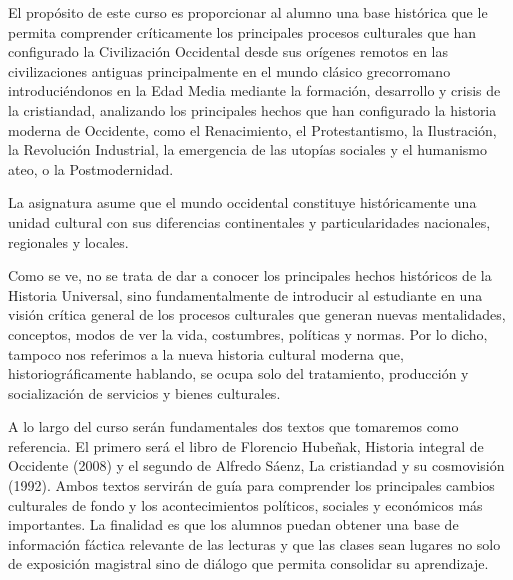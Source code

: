 \begin{syllabus}


\begin{justification}
	El propósito de este curso es proporcionar al alumno una base histórica 
	que le permita comprender críticamente los principales procesos culturales 
	que han configurado la Civilización Occidental desde sus orígenes remotos en 
	las civilizaciones antiguas principalmente en el mundo clásico grecorromano 
	introduciéndonos en la Edad Media mediante la formación, desarrollo y crisis 
	de la cristiandad, analizando los principales hechos que han configurado la 
	historia moderna de Occidente, como el Renacimiento, el Protestantismo, 
	la Ilustración, la Revolución Industrial, la emergencia de las utopías sociales 
	y el humanismo ateo, o la Postmodernidad.
	
	La asignatura asume que el mundo occidental constituye históricamente una 
	unidad cultural con sus diferencias continentales y particularidades nacionales, 
	regionales y locales.
	
	Como se ve, no se trata de dar a conocer los principales hechos históricos de la 
	Historia Universal, sino fundamentalmente de introducir al estudiante en una 
	visión crítica general de los procesos culturales que generan nuevas mentalidades, 
	conceptos, modos de ver la vida, costumbres, políticas y normas. 
	Por lo dicho, tampoco nos referimos a la nueva historia cultural moderna que, 
	historiográficamente hablando, se ocupa solo del tratamiento, producción y 
	socialización de servicios y bienes culturales.
	
	A lo largo del curso serán fundamentales dos textos que tomaremos como referencia. 
	El primero será el libro de Florencio Hubeñak, Historia integral de Occidente (2008) 
	y el segundo de Alfredo Sáenz, La cristiandad y su cosmovisión (1992). 
	Ambos textos servirán de guía para comprender los principales cambios culturales 
	de fondo y los acontecimientos políticos, sociales y económicos más importantes.
	La finalidad es que los alumnos puedan obtener una base de información fáctica 
	relevante de las lecturas y que las clases sean lugares no solo de exposición 
	magistral sino de diálogo que permita consolidar su aprendizaje.
	

\end{justification}
\end{syllabus}
